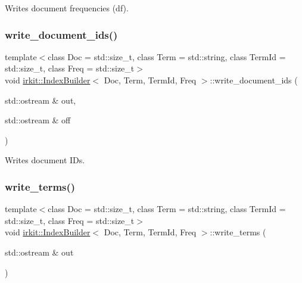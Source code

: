 Writes document frequencies (df). 

\mbox{\label{classirkit_1_1IndexBuilder_af8d8c6c446a064ec7c9b2a05b522555e}} 
\subsubsection{\texorpdfstring{write\+\_\+document\+\_\+ids()}{write\_document\_ids()}}
{\footnotesize\ttfamily template$<$class Doc  = std\+::size\+\_\+t, class Term  = std\+::string, class Term\+Id  = std\+::size\+\_\+t, class Freq  = std\+::size\+\_\+t$>$ \\
void \hyperlink{classirkit_1_1IndexBuilder}{irkit\+::\+Index\+Builder}$<$ Doc, Term, Term\+Id, Freq $>$\+::write\+\_\+document\+\_\+ids (\begin{DoxyParamCaption}\item[{std\+::ostream \&}]{out,  }\item[{std\+::ostream \&}]{off }\end{DoxyParamCaption})\hspace{0.3cm}{\ttfamily [inline]}}



Writes document I\+Ds. 

\mbox{\label{classirkit_1_1IndexBuilder_a7c81e735e585ec41a7e5e334e4416874}} 
\subsubsection{\texorpdfstring{write\+\_\+terms()}{write\_terms()}}
{\footnotesize\ttfamily template$<$class Doc  = std\+::size\+\_\+t, class Term  = std\+::string, class Term\+Id  = std\+::size\+\_\+t, class Freq  = std\+::size\+\_\+t$>$ \\
void \hyperlink{classirkit_1_1IndexBuilder}{irkit\+::\+Index\+Builder}$<$ Doc, Term, Term\+Id, Freq $>$\+::write\+\_\+terms (\begin{DoxyParamCaption}\item[{std\+::ostream \&}]{out }\end{DoxyParamCaption})\hspace{0.3cm}{\ttfamily [inline]}}



